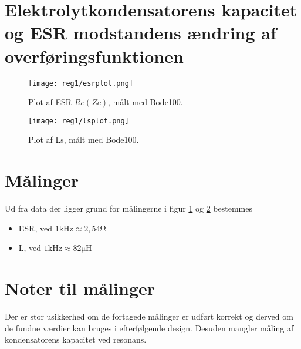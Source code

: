 \section{Elektrolytkondensatorens kapacitet og ESR modstandens ændring af overføringsfunktionen}\label{sec:spm4}

\begin{figure}[h!]
	\centering
	\texttt{[image: reg1/esrplot.png]}
	\caption{Plot af ESR $Re(Zc)$, målt med Bode100.}
	\label{fig:esrplot}
\end{figure}
\FloatBlock

\begin{figure}[h!]
	\centering
	\texttt{[image: reg1/lsplot.png]}
	\caption{Plot af Ls, målt med Bode100.}
	\label{fig:lsplot}
\end{figure}
\FloatBlock
\section*{Målinger}
Ud fra data der ligger grund for målingerne i figur \ref{fig:esrplot} og \ref{fig:lsplot} bestemmes
\begin{itemize}
	\item ESR, ved $1 \si{\kilo\hertz} \approx 2,54 \si{\ohm}$
	\item L, ved $1 \si{\kilo\hertz} \approx 82 \si{\micro\henry}$
\end{itemize} 

\section*{Noter til målinger}
Der er stor usikkerhed om de fortagede målinger er udført korrekt og derved om de fundne værdier kan bruges i efterfølgende design.
Desuden mangler måling af kondensatorens kapacitet ved resonans.